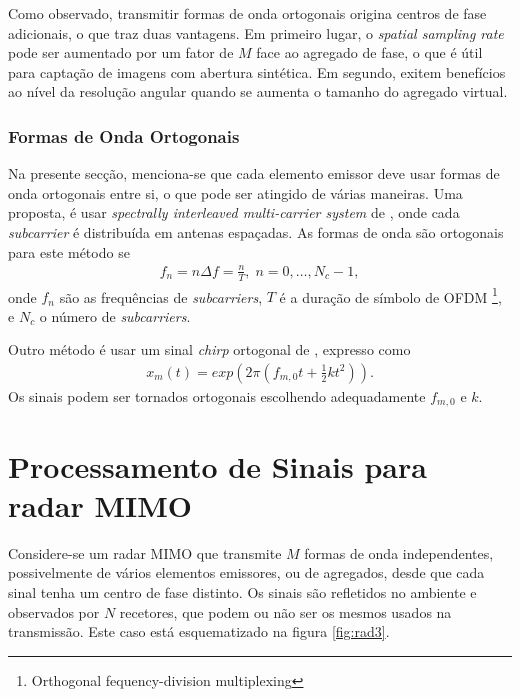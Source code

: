 \documentclass[purist,portuguese]{ist-report}
\begin{document}
Como observado, transmitir formas de onda ortogonais origina centros de fase adicionais, o que traz duas vantagens.
Em primeiro lugar, o \textit{spatial sampling rate} pode ser aumentado por um fator de $M$ face ao agregado de fase, o que é útil para captação de imagens com abertura sintética.
Em segundo, exitem benefícios ao nível da resolução angular quando se aumenta o tamanho do agregado virtual.

\subsubsection{Formas de Onda Ortogonais}

Na presente secção, menciona-se que cada elemento emissor deve usar formas de onda ortogonais entre si, o que pode ser atingido de várias maneiras.
Uma proposta, é usar \textit{spectrally interleaved multi-carrier system} de \cite{sturm2013spectrally}, onde cada \textit{subcarrier} é distribuída em antenas espaçadas.
As formas de onda são ortogonais para este método se 
\begin{align}
  f_n = n\Delta f = \frac{n}{T}, \; n=0,\ldots,N_c -1,
  \label{eq:orth}
\end{align}
onde $f_n$ são as frequências de \textit{subcarriers}, $T$ é a duração de símbolo de OFDM \footnote{Orthogonal fequency-division multiplexing}, e $N_c$ o número de \textit{subcarriers}.

Outro método é usar um sinal \textit{chirp} ortogonal de \cite{chen2008mimo}, expresso como
\begin{align}
  x_m(t)= exp\left( 2\pi \left( f_{m,0}t+\frac{1}{2}kt^2 \right) \right).
  \label{eq:chirp}
\end{align}
Os sinais podem ser tornados ortogonais escolhendo adequadamente $f_{m,0}$ e $k$.


\section{Processamento de Sinais para radar MIMO}

Considere-se um radar MIMO que transmite $M$ formas de onda independentes, possivelmente de vários elementos emissores, ou de agregados, desde que cada sinal tenha um centro de fase distinto.
Os sinais são refletidos no ambiente e observados por $N$ recetores, que podem ou não ser os mesmos usados na transmissão.
Este caso está esquematizado na figura \ref{fig:rad3}.
\end{document}
